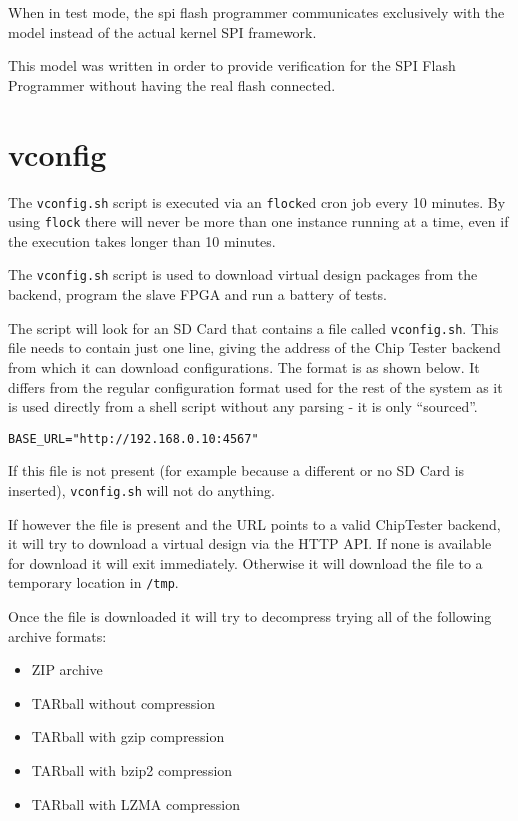 When in test mode, the spi flash programmer communicates exclusively with the model
instead of the actual kernel SPI framework.

This model was written in order to provide verification for the SPI Flash Programmer
without having the real flash connected.


\newpage
\section{vconfig}
The \texttt{vconfig.sh} script is executed via an \texttt{flock}ed cron job every 10 minutes.
By using \texttt{flock} there will never be more than one instance running at a time, even if
the execution takes longer than 10 minutes.

The \texttt{vconfig.sh} script is used to download virtual design packages from the
backend, program the slave FPGA and run a battery of tests.

The script will look for an SD Card that contains a file called \texttt{vconfig.sh}. This
file needs to contain just one line, giving the address of the Chip Tester backend from
which it can download configurations. The format is as shown below. It differs from the
regular configuration format used for the rest of the system as it is used directly from
a shell script without any parsing - it is only ``sourced''.
\lstset{basicstyle=\scriptsize\ttfamily}
\begin{lstlisting}
BASE_URL="http://192.168.0.10:4567"
\end{lstlisting}

If this file is not present (for example because a different or no SD Card is inserted),
\texttt{vconfig.sh} will not do anything.

If however the file is present and the URL points to a valid ChipTester backend, it will
try to download a virtual design via the HTTP API. If none is available for download it
will exit immediately. Otherwise it will download the file to a temporary location in \texttt{/tmp}.

Once the file is downloaded it will try to decompress trying all of the following archive formats:
\begin{itemize}
 \item ZIP archive
 \item TARball without compression
 \item TARball with gzip compression
 \item TARball with bzip2 compression
 \item TARball with LZMA compression
\end{itemize}

